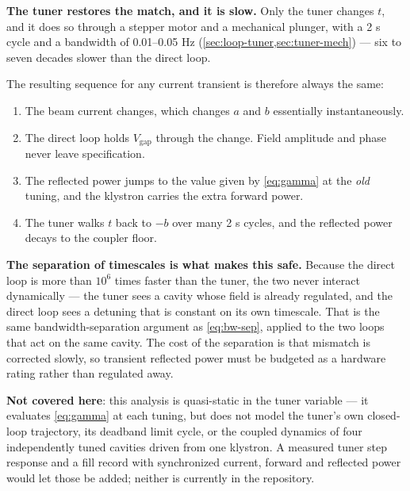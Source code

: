 \textbf{The tuner restores the match, and it is slow.} Only the tuner changes \(t\), and it does so through a stepper motor and a mechanical plunger, with a 2 s cycle and a bandwidth of 0.01--0.05 Hz (\cref{sec:loop-tuner,sec:tuner-mech}) --- six to seven decades slower than the direct loop.

The resulting sequence for any current transient is therefore always the same:

\begin{enumerate}
\def\labelenumi{\arabic{enumi}.}
\tightlist
\item
  The beam current changes, which changes \(a\) and \(b\) essentially instantaneously.
\item
  The direct loop holds \(V_\text{gap}\) through the change. Field amplitude and phase never leave specification.
\item
  The reflected power jumps to the value given by \cref{eq:gamma} at the \emph{old} tuning, and the klystron carries the extra forward power.
\item
  The tuner walks \(t\) back to \(-b\) over many 2 s cycles, and the reflected power decays to the coupler floor.
\end{enumerate}

\begin{keynote}
\textbf{The separation of timescales is what makes this safe.} Because the direct loop is more than \(10^6\) times faster than the tuner, the two never interact dynamically --- the tuner sees a cavity whose field is already regulated, and the direct loop sees a detuning that is constant on its own timescale. That is the same bandwidth-separation argument as \cref{eq:bw-sep}, applied to the two loops that act on the same cavity. The cost of the separation is that mismatch is corrected slowly, so transient reflected power must be budgeted as a hardware rating rather than regulated away.
\end{keynote}

\begin{keynote}
\textbf{Not covered here}: this analysis is quasi-static in the tuner variable --- it evaluates \cref{eq:gamma} at each tuning, but does not model the tuner's own closed-loop trajectory, its deadband limit cycle, or the coupled dynamics of four independently tuned cavities driven from one klystron. A measured tuner step response and a fill record with synchronized current, forward and reflected power would let those be added; neither is currently in the repository.
\end{keynote}

